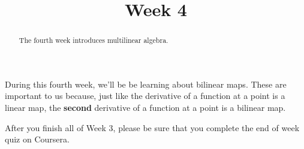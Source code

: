 \documentclass{ximera}
\title{Week 4}
\begin{document}
\begin{abstract}
  The fourth week introduces multilinear algebra.
\end{abstract}

During this fourth week, we'll be be learning about bilinear maps.  These are important to us because, just like the derivative
of a function at a point is a linear map, the \textbf{second} derivative of a function at a point is a bilinear map.

After you finish all of Week 3, please be sure that you complete the
end of week quiz on Coursera.
\end{document}
